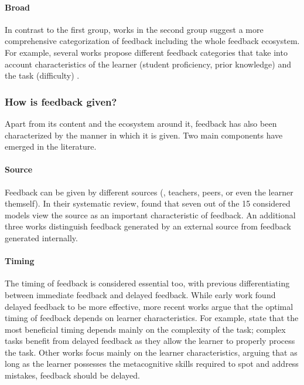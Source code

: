 \paragraph{Broad} In contrast to the first group, works in the second group suggest a more comprehensive categorization of feedback including the whole feedback ecosystem. For example, several works propose different feedback categories that take into account characteristics of the learner (student proficiency, prior knowledge) and the task (difficulty) \citep{mason_providing_2001,narciss_how_2004,narciss_feedback_2008}. 


\subsubsection{How is feedback given?}
\label{sec:feedback_how}
Apart from its content and the ecosystem around it, feedback has also been characterized by the manner in which it is given. Two main components have emerged in the literature.

\paragraph{Source} Feedback can be given by different sources (\eg, teachers, peers, or even the learner themself). In their systematic review, \citet{lipnevich_review_2021} found that seven out of the 15 considered models view the source as an important characteristic of feedback. An additional three works distinguish feedback generated by an external source from feedback generated internally.

\paragraph{Timing} The timing of feedback is considered essential too, with previous differentiating between immediate feedback and delayed feedback. While early work \cite{bangert-drowns_instructional_1991} found delayed feedback to be more effective, more recent works \cite{mason_providing_2001} argue that the optimal timing of feedback depends on learner characteristics. For example, \citet{hattie_power_2007} state that the most beneficial timing depends mainly on the complexity of the task; complex tasks benefit from delayed feedback as they allow the learner to properly process the task. Other works \cite{narciss_feedback_2008} focus mainly on the learner characteristics, arguing that as long as the learner possesses the metacognitive skills required to spot and address mistakes, feedback should be delayed. 


